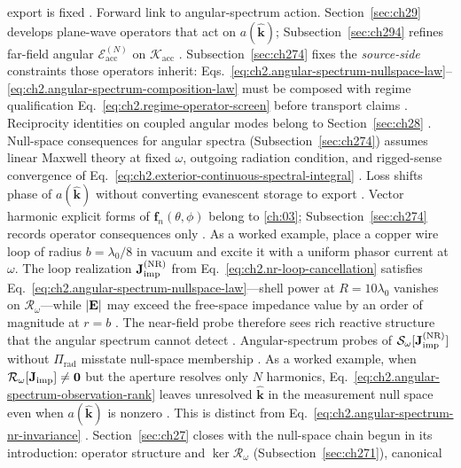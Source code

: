 export is fixed \cite{stratton1941}.
Forward link to angular-spectrum action. Section~\ref{sec:ch29} develops plane-wave operators that act on \(a(\widehat{\mathbf{k}})\);
Subsection~\ref{sec:ch294} refines far-field angular $\mathcal{E}_{\mathrm{acc}}^{(N)}$ on
\(\mathcal{K}_{\mathrm{acc}}\) \cite{stratton1941}. Subsection~\ref{sec:ch274} fixes the \emph{source-side} constraints those operators inherit:
Eqs.~\eqref{eq:ch2.angular-spectrum-nullspace-law}--\eqref{eq:ch2.angular-spectrum-composition-law}
must be composed with regime qualification Eq.~\eqref{eq:ch2.regime-operator-screen} before transport
claims \cite{stratton1941}. Reciprocity identities on coupled angular modes belong to
Section~\ref{sec:ch28} \cite{harrington2001}.
Null-space consequences for angular spectra (Subsection~\ref{sec:ch274}) assumes linear Maxwell theory at fixed
\(\omega\), outgoing radiation condition, and rigged-sense convergence of
Eq.~\eqref{eq:ch2.exterior-continuous-spectral-integral} \cite{stratton1941}.
Loss shifts phase of \(a(\widehat{\mathbf{k}})\) without converting evanescent storage to export
\cite{stratton1941}. Vector harmonic explicit forms of \(\mathbf{f}_n(\theta,\phi)\) belong to
\ref{ch:03}; Subsection~\ref{sec:ch274} records operator consequences only
\cite{harrington2001}. As a worked example, place a copper wire loop of radius \(b=\lambda_0/8\) in vacuum and excite it with a uniform
phasor current at \(\omega\). The loop realization \(\mathbf{J}_{\mathrm{imp}}^{\mathrm{(NR)}}\) from
Eq.~\eqref{eq:ch2.nr-loop-cancellation} satisfies
Eq.~\eqref{eq:ch2.angular-spectrum-nullspace-law}---shell power at
\(R=10\lambda_0\) vanishes on $\mathcal{R}_\omega$---while \(|\mathbf{E}|\) may exceed the free-space
impedance value by an order of magnitude at \(r=b\) \cite{stratton1941}. The near-field probe
therefore sees rich reactive structure that the angular spectrum cannot detect
\cite{harrington2001}. Angular-spectrum
probes of \(\mathcal{S}_\omega[\mathbf{J}_{\mathrm{imp}}^{\mathrm{(NR)}}]\) without \(\Pi_{\mathrm{rad}}\) misstate
null-space membership \cite{harrington2001}.
As a worked example, when \(\mathcal{R}_\omega[\mathbf{J}_{\mathrm{imp}}]\neq\mathbf{0}\) but the aperture resolves only \(N\) harmonics,
Eq.~\eqref{eq:ch2.angular-spectrum-observation-rank} leaves unresolved \(\widehat{\mathbf{k}}\)
in the measurement null space even when \(a(\widehat{\mathbf{k}})\) is nonzero
\cite{stratton1941}. This is distinct from
Eq.~\eqref{eq:ch2.angular-spectrum-nr-invariance} \cite{stratton1941}. \medskip
\noindent
Section~\ref{sec:ch27} closes with the null-space chain begun in its introduction:
operator structure and \(\ker\mathcal{R}_\omega\) (Subsection~\ref{sec:ch271}), canonical
